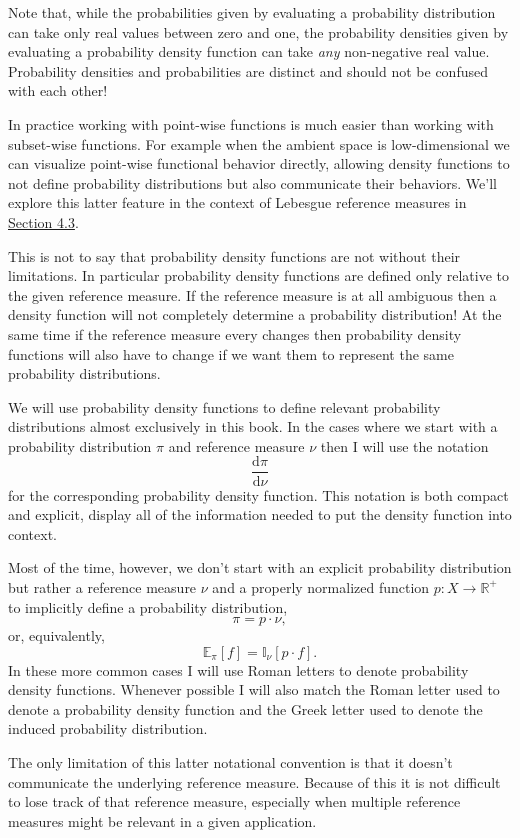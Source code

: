 \documentclass[
  letterpaper,
  DIV=11,
  numbers=noendperiod]{scrartcl}
\begin{document}
Note that, while the probabilities given by evaluating a probability
distribution can take only real values between zero and one, the
probability densities given by evaluating a probability density function
can take \emph{any} non-negative real value. Probability densities and
probabilities are distinct and should not be confused with each other!

In practice working with point-wise functions is much easier than
working with subset-wise functions. For example when the ambient space
is low-dimensional we can visualize point-wise functional behavior
directly, allowing density functions to not define probability
distributions but also communicate their behaviors. We'll explore this
latter feature in the context of Lebesgue reference measures in
\href{@sec:visualizing}{Section 4.3}.

This is not to say that probability density functions are not without
their limitations. In particular probability density functions are
defined only relative to the given reference measure. If the reference
measure is at all ambiguous then a density function will not completely
determine a probability distribution! At the same time if the reference
measure every changes then probability density functions will also have
to change if we want them to represent the same probability
distributions.

We will use probability density functions to define relevant probability
distributions almost exclusively in this book. In the cases where we
start with a probability distribution \(\pi\) and reference measure
\(\nu\) then I will use the notation \[
\frac{ \mathrm{d} \pi}{ \mathrm{d} \nu}
\] for the corresponding probability density function. This notation is
both compact and explicit, display all of the information needed to put
the density function into context.

Most of the time, however, we don't start with an explicit probability
distribution but rather a reference measure \(\nu\) and a properly
normalized function \(p : X \rightarrow \mathbb{R}^{+}\) to implicitly
define a probability distribution, \[
\pi = p \cdot \nu,
\] or, equivalently, \[
\mathbb{E}_{\pi}[f] = \mathbb{I}_{\nu}[p \cdot f].
\] In these more common cases I will use Roman letters to denote
probability density functions. Whenever possible I will also match the
Roman letter used to denote a probability density function and the Greek
letter used to denote the induced probability distribution.

The only limitation of this latter notational convention is that it
doesn't communicate the underlying reference measure. Because of this it
is not difficult to lose track of that reference measure, especially
when multiple reference measures might be relevant in a given
application.
\end{document}
